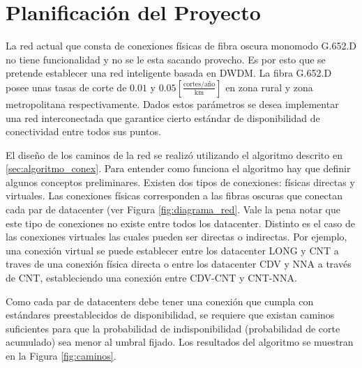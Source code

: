\section{Planificaci\'on del Proyecto}\label{sec:planificacion}

La red actual que consta de conexiones físicas de fibra oscura monomodo G.652.D no tiene funcionalidad y no se le esta sacando provecho. Es por esto que se pretende establecer una red inteligente basada en DWDM. La fibra G.652.D posee unas tasas de corte de $0.01$ y $0.05 [\frac{\text{cortes}/\text{año}}{\text{km}}]$ en zona rural y zona metropolitana respectivamente. Dados estos parámetros se desea implementar una red interconectada que garantice cierto estándar de disponibilidad de conectividad entre todos sus puntos.

El diseño de los caminos de la red se realizó utilizando el algoritmo descrito en \ref{sec:algoritmo_conex}. Para entender como funciona el algoritmo hay que definir algunos conceptos preliminares. Existen dos tipos de conexiones: físicas directas y virtuales. Las conexiones físicas corresponden a las fibras oscuras que conectan cada par de datacenter (ver Figura \ref{fig:diagrama_red}. Vale la pena notar que este tipo de conexiones no existe entre todos los datacenter. Distinto es el caso de las conexiones virtuales las cuales pueden ser directas o indirectas. Por ejemplo, una conexión virtual se puede establecer entre los datacenter LONG y CNT a traves de una conexión física directa o entre los datacenter CDV y NNA a través de CNT, estableciendo una conexión entre CDV-CNT y CNT-NNA.

Como cada par de datacenters debe tener una conexión que cumpla con estándares preestablecidos de disponibilidad, se requiere que existan caminos suficientes para que la probabilidad de indisponibilidad (probabilidad de corte acumulado) sea menor al umbral fijado. Los resultados del algoritmo se muestran en la Figura \ref{fig:caminos}.

